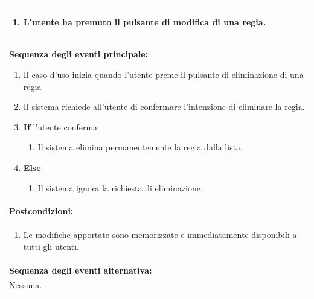 \documentclass{article}
\begin{document}
\begin{table}[H]
\begin{tabular}{|p{\linewidth}|}
                        \cellcolor{gray!20}
                        \begin{minipage}{\linewidth}
                            \begin{enumerate}
                                \item L'utente ha premuto il pulsante di modifica di una regia.
                            \end{enumerate}
                        \end{minipage} \\
                        \hline
                        \textbf{Sequenza degli eventi principale:}
                        \begin{enumerate}
                            \item Il caso d'uso inizia quando l'utente preme il pulsante di eliminazione di una regia
                            \item Il sistema richiede all'utente di confermare l'intenzione di eliminare la regia.
                            \item \textbf{If} l'utente conferma
                                \begin{enumerate}
                                    \item Il sistema elimina permanentemente la regia dalla lista.
                                \end{enumerate}
                            \item \textbf{Else}
                                \begin{enumerate}
                                    \item Il sistema ignora la richiesta di eliminazione.
                                \end{enumerate}
                        \end{enumerate} \\
                        \hline
                        \cellcolor{gray!20}
                        \textbf{Postcondizioni:} \\
                        \cellcolor{gray!20}
                        \begin{minipage}{\linewidth}
                            \begin{enumerate}
                                \item Le modifiche apportate sono memorizzate e immediatamente disponibili a tutti gli utenti.
                            \end{enumerate}
                        \end{minipage} \\
                        \hline
                        \textbf{Sequenza degli eventi alternativa:} \\
                        Nessuna. \\
                        \hline
                    \end{tabular}
                \end{table}
\end{document}
